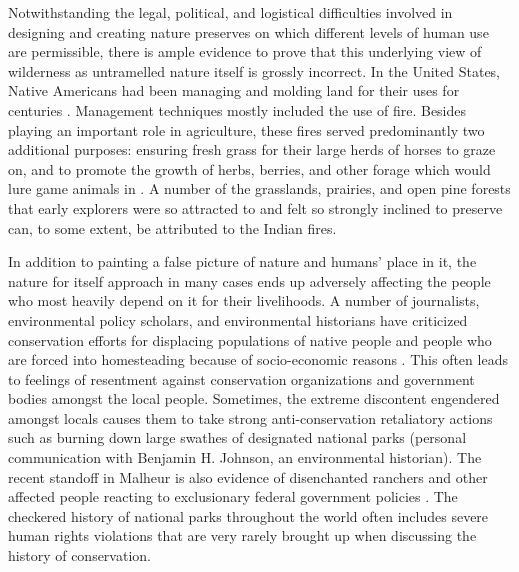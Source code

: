 \documentclass[rutwik_proposal.tex]{subfiles}
\begin{document}
Notwithstanding the legal, political, and logistical difficulties involved in designing and creating nature preserves on which different levels of human use are permissible, there is ample evidence to prove that this underlying view of wilderness as untramelled nature itself is grossly incorrect. In the United States, Native Americans had been managing and molding land for their uses for centuries \cite{Langston95, Steinberg13, Butzer99}. Management techniques mostly included the use of fire. Besides playing an important role in agriculture, these fires served predominantly two additional purposes: ensuring fresh grass for their large herds of horses to graze on, and to promote the growth of herbs, berries, and other forage which would lure game animals in \cite{Langston95, Pyne82}. A number of the grasslands, prairies, and open pine forests that early explorers were so attracted to and felt so strongly inclined to preserve can, to some extent, be attributed to the Indian fires.

In addition to painting a false picture of nature and humans' place in it, the nature for itself approach in many cases ends up adversely affecting the people who most heavily depend on it for their livelihoods. A number of journalists, environmental policy scholars, and environmental historians have criticized conservation efforts for displacing populations of native people and people who are forced into homesteading because of socio-economic reasons \cite{Agrawal09, Dowie06, Johnson99}. This often leads to feelings of resentment against conservation organizations and government bodies amongst the local people. Sometimes, the extreme discontent engendered amongst locals causes them to take strong anti-conservation retaliatory actions such as burning down large swathes of designated national parks (personal communication with Benjamin H. Johnson, an environmental historian). The recent standoff in Malheur is also evidence of disenchanted ranchers and other affected people reacting to exclusionary federal government policies \cite{Langston16}. The checkered history of national parks throughout the world often includes severe human rights violations that are very rarely brought up when discussing the history of conservation.
\end{document}
